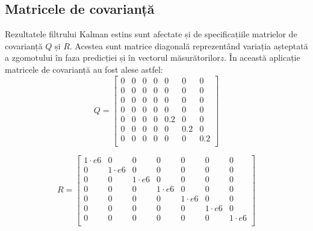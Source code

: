 \subsection{Matricele de covarianță}
\-\hspace{1cm}Rezultatele filtrului Kalman estins sunt afectate și de specificațiile matrielor de covarianță $Q$ și $R$. Acestea sunt matrice diagonală reprezentând variația așteptată a zgomotului în faza predicției și în vectorul măsurătorilor$z$. În această aplicație matricele de covarianță au fost alese astfel:
\begin{equation}
{\mathsf{\textit{Q}} = 
\begin{bmatrix}
0 & 0 & 0 & 0 & 0 & 0 & 0\\
0 & 0 & 0 & 0 & 0 & 0 & 0\\
0 & 0 & 0 & 0 & 0 & 0 & 0\\
0 & 0 & 0 & 0 & 0 & 0 & 0\\

0 & 0 & 0 & 0 & 0.2 & 0 & 0\\
0 & 0 & 0 & 0 & 0 & 0.2 & 0\\
0 & 0 & 0 & 0 & 0 & 0 & 0.2\\

\end{bmatrix}}
\end{equation}

\begin{equation}
{\mathsf{\textit{R}} = 
\begin{bmatrix}
1\cdot e6 & 0 & 0 & 0 & 0 & 0 & 0\\
0 & 1\cdot e6 & 0 & 0 & 0 & 0 & 0\\
0 & 0 & 1\cdot e6 & 0 & 0 & 0 & 0\\
0 & 0 & 0 & 1\cdot e6 & 0 & 0 & 0\\

0 & 0 & 0 & 0 & 1\cdot e6 & 0 & 0\\
0 & 0 & 0 & 0 & 0 & 1\cdot e6 & 0\\
0 & 0 & 0 & 0 & 0 & 0 & 1\cdot e6\\

\end{bmatrix}}
\end{equation}

